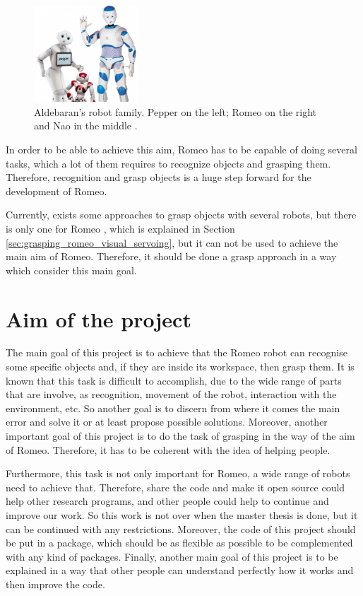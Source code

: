 \documentclass[12pt,a4paper,final,twoside,openright]{report}
\begin{document}
\begin{figure}
	    \centering
		\includegraphics[width=0.35\textwidth]{images/romeo_nao_pepper.jpg}
         \caption{Aldebaran's robot family. Pepper on the left; Romeo on the right and Nao in the middle \autocite{ParPaul}. \label{fig:aldebaran_family}}
\end{figure}

In order to be able to achieve this aim, Romeo has to be capable of doing several tasks, which a lot of them requires to recognize objects and grasping them. Therefore, recognition and grasp objects is a huge step forward for the development of Romeo. 

Currently, exists some approaches to grasp objects with several robots, but there is only one for Romeo  \cite{claudio:hal-01159882}, which is explained in Section \ref{sec:grasping_romeo_visual_servoing}, but it can not be used to achieve the main aim of Romeo. Therefore, it should be done a grasp approach in a way which consider this main goal.  

\section{Aim of the project}
\label{sec:aim_project}

The main goal of this project is to achieve that the Romeo robot can recognise some specific objects and, if they are inside its workspace, then grasp them. It is known that this task is difficult to accomplish, due to the wide range of parts that are involve, as recognition, movement of the robot, interaction with the environment, etc. So another goal is to discern from where it comes the main error and solve it or at least propose possible solutions. Moreover, another important goal of this project is to do the task of grasping in the way of the aim of Romeo. Therefore, it has to be coherent with the idea of helping people.

Furthermore, this task is not only important for Romeo, a wide range of robots need to achieve that. Therefore, share the code and make it open source could help other research programs, and other people could help to continue and improve our work. So this work is not over when the master thesis is done, but it can be continued with any restrictions. Moreover, the code of this project should be put in a package, which should be as flexible as possible to be complemented with any kind of packages. Finally, another main goal of this project is to be explained in a way that other people can understand perfectly how it works and then improve the code.
\end{document}
